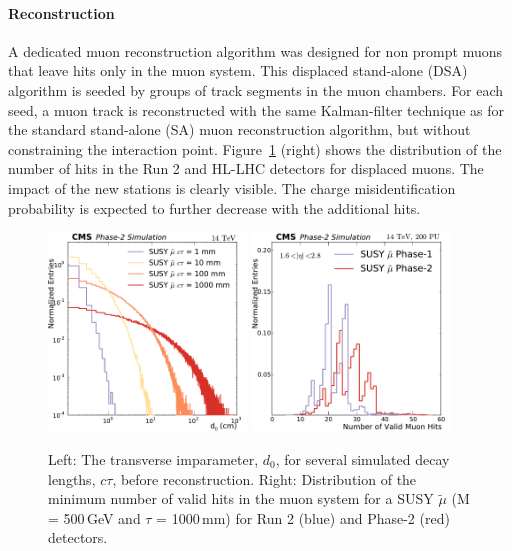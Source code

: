 
\paragraph{Reconstruction}

A dedicated muon reconstruction algorithm was designed for non prompt muons that leave hits only in the muon system. 
This displaced stand-alone (DSA) algorithm is seeded by groups of track segments in the muon chambers. For each seed, a muon track is reconstructed with the same Kalman-filter technique as for the standard stand-alone (SA) muon reconstruction algorithm, 
but without constraining the interaction point.
Figure~\ref{fig:perfDisplaced} (right) shows the distribution of the number of hits in the Run 2 and HL-LHC detectors for displaced muons. The impact of the new stations is clearly visible. 
The charge misidentification probability is expected to further decrease with the additional hits.

\begin{figure}[hbtp]\begin{center}
\includegraphics[width=0.47\textwidth]{figures/Stage0h1_0_d0_smuon_daughter}
\includegraphics[width=0.47\textwidth]{figures/MuonHitsEndcap}
\caption{
Left: The transverse imparameter, $d_{0}$, for several simulated decay lengths, $c\tau$, before reconstruction.
Right: Distribution of the minimum number of valid hits in the muon system for a SUSY $\widetilde{\mu}$ (M = 500\,GeV and $\tau$ = 1000\,mm) for Run 2 (blue) and Phase-2 (red) detectors. 
}
\label{fig:perfDisplaced}
\end{center}
\end{figure}

